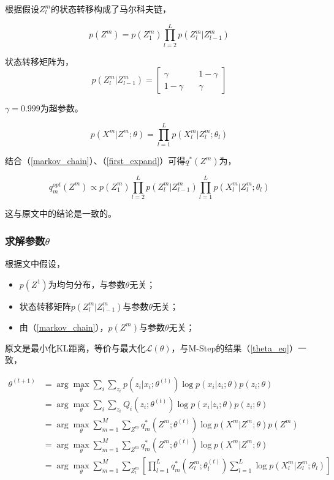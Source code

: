 		根据假设$Z^m_l$的状态转移构成了马尔科夫链，

		\begin{equation}
			p(Z^m) = p(Z^m_1)\prod_{l=2}^L p(Z^m_l|Z^m_{l-1})\label{markov_chain}
		\end{equation}

		状态转移矩阵为，
		$$
			p(Z^m_l|Z^m_{l-1}) = \begin{bmatrix}
				\gamma\quad & 1-\gamma\\
				1-\gamma\quad & \gamma
			\end{bmatrix}
		$$

		$\gamma=0.999$为超参数。

		\begin{equation}
			p(X^m|Z^m;\theta) = \prod_{l=1}^L p(X^m_l|Z^m_l;\theta_l)\label{first_expand}
		\end{equation}

		结合（\ref{markov_chain}）、（\ref{first_expand}）可得$q^*(Z^m)$为，

		\begin{equation}
			\boxed{
			q^{opt}_m(Z^m) \propto  p(Z^m_1)\prod_{l=2}^L p(Z^m_l|Z^m_{l-1})  \prod_{l=1}^L p(X^m_l|Z^m_l;\theta_l)
			}\label{q_z_eq}
		\end{equation}

		这与原文中的结论是一致的。

	\subsubsection*{求解参数$\theta$}

		根据文中假设，

		\begin{itemize}
			\item $p(Z^1)$为均匀分布，与参数$\theta$无关；
			\item 状态转移矩阵$p(Z^m_l|Z^m_{l-1})$与参数$\theta$无关；
			\item 由（\ref{markov_chain}），$p(Z^m)$与参数$\theta$无关；
		\end{itemize}

		原文是最小化KL距离，等价与最大化$\mathcal{L}(\theta)$，与M-Step的结果（\ref{theta_eq}）一致，

		\begin{align*}
			\theta^{(t+1)} &= \arg\max_\theta \sum_i \sum_{z_i} p(z_i|x_i;\theta^{(t)})\log p(x_i|z_i;\theta)p(z_i;\theta)\\
			&= \arg\max_\theta \sum_i \sum_{z_i} Q_i(z_i;\theta^{(t)})\log p(x_i|z_i;\theta)p(z_i;\theta)\\
			&= \arg\max_\theta \sum_{m=1}^M \sum_{Z^m} q^*_m(Z^m;\theta^{(t)})\log p(X^m|Z^m;\theta)p(Z^m)\\
			&= \arg\max_\theta \sum_{m=1}^M \sum_{Z^m} q^*_m(Z^m;\theta^{(t)})\log p(X^m|Z^m;\theta)\\
			&= \arg\max_\theta \sum_{m=1}^M \sum_{Z^m_l} 
				\left[ 
					\prod_{l=1}^L q^*_m(Z^m_l;\theta^{(t)}_l)\sum_{l=1}^L\log p(X^m_l|Z^m_l;\theta_l)
				\right]
		\end{align*}	

